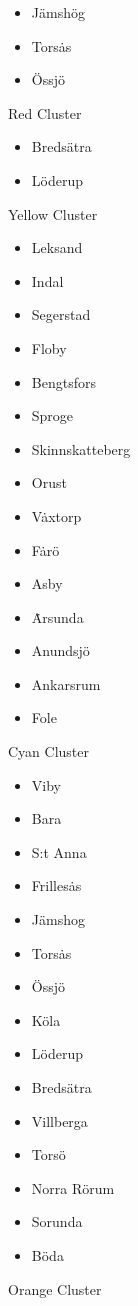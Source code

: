 \begin{figure}
\begin{itemize}
\item J\"amsh\"og
\item Tors\.as
\item \"Ossj\"o
\end{itemize}
\caption{Red Cluster}
\label{red-cluster}
\end{figure}

\begin{figure}
\begin{itemize}
\item Breds\"atra
\item L\"oderup
\end{itemize}
\caption{Yellow Cluster}
\label{yellow-cluster}
\end{figure}

\begin{figure}
\begin{itemize}
\item Leksand
\item Indal
\item Segerstad
\item Floby
\item Bengtsfors
\item Sproge
\item Skinnskatteberg
\item Orust
\item V\.axtorp
\item F\.ar\"o
\item Asby
\item \.Arsunda
\item Anundsj\"o
\item Ankarsrum
\item Fole
\end{itemize}
\caption{Cyan Cluster}
\label{cyan-cluster}
\end{figure}

\begin{figure}
\begin{itemize}
\item Viby
\item Bara
\item S:t Anna
\item Frilles\.as
\item J\"amshog
\item Tors\.as
\item \"Ossj\"o
\item K\"ola
\item L\"oderup
\item Breds\"atra
\item Villberga
\item Tors\"o
\item Norra R\"orum
\item Sorunda
\item B\"oda
\end{itemize}
\caption{Orange Cluster}
\label{orange-cluster}
\end{figure}

